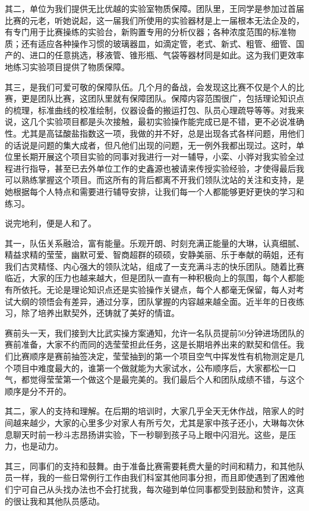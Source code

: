\documentclass[
]{book}
\begin{document}
其二，单位为我们提供无比优越的实验室物质保障。团队里，王同学是参加过首届比赛的元老，听她说起，这一届我们所使用的实验器材是上一届根本无法企及的，有专门用于比赛操练的实验台，新购置专用的分析仪器；各种浓度范围的标准物质；还有适应各种操作习惯的玻璃器皿，如滴定管，老式、新式、粗管、细管、国产的、进口的任意挑选，移液管、锥形瓶、气袋等器材同是如此。这为我们更效率地练习实验项目提供了物质保障。

其三，是我们可爱可敬的保障队伍。几个月的备战，会发现这比赛不仅是个人的比赛，更是团队比赛，这团队里就有保障团队。保障内容范围很广，包括理论知识点的梳理，标准曲线的校准绘制，仪器设备的搬运打包、队员心理疏导等等。对我来说，这几个实验项目都是头次接触，最初实验操作能完成已是不错，更不必说准确性。尤其是高锰酸盐指数这一项，我做的并不好，总是出现各式各样问题，用他们的话说是问题的集大成者，但凡他们出现的问题，无一例外我都出现过。这时，单位里长期开展这个项目实验的同事对我进行一对一辅导，小栾、小骅对我实验全过程进行指导，甚至已去外单位工作的史鑫源也被请来传授实验经验，才使得最后我可以熟练掌握这个项目。而这所有的背后都离不开我们领队沈站的关注和支持，是她根据每个人特点和需要进行辅导安排，让我们每一个人都能够更好更快的学习和练习。

说完地利，便是人和了。

其一，队伍关系融洽，富有能量。乐观开朗、时刻充满正能量的大琳，认真细腻、精益求精的莹莹，幽默可爱、智商超群的硕硕，安静美丽、乐于奉献的萌姐，还有我们古灵精怪、内心强大的领队沈站，组成了一支充满斗志的快乐团队。随着比赛临近，大家的压力也越来越大，但是团队一直有一种积极向上的氛围，每个人都能有所依托。无论是理论知识点还是实验操作关键点，每个人都毫无保留，每人对考试大纲的领悟会有差异，通过分享，团队掌握的内容越来越全面。近半年的日夜练习，除了培养出默契外，还铸就了美好的情谊。

赛前头一天，我们接到大比武实操方案通知，允许一名队员提前50分钟进场团队的赛前准备，大家不约而同的选莹莹担此任务，这是长期培养出来的默契和信任。我们比赛顺序是赛前抽签决定，莹莹抽到的第一个项目空气中挥发性有机物测定是几个项目中难度最大的，谁第一个做就能为大家试水，公布顺序后，大家都松一口气，都觉得莹莹第一个做这个是最完美的。我们最后个人和团队成绩不错，与这个顺序是分不开的。

其二，家人的支持和理解。在后期的培训时，大家几乎全天无休作战，陪家人的时间越来越少，大家的心里多少对家人有所亏欠，尤其是家中孩子还小，大琳每次休息聊天时前一秒斗志昂扬讲实验，下一秒聊到孩子马上眼中闪泪光。这些，是压力，也是动力。

其三，同事们的支持和鼓舞。由于准备比赛需要耗费大量的时间和精力，和其他队员一样，我的一些日常例行工作由我们科室其他同事分担，而且即使遇到了困难他们宁可自己从头找办法也不会打扰我，每次碰到单位同事都受到鼓励和赞许，这真的很让我和其他队员感动。
\end{document}
